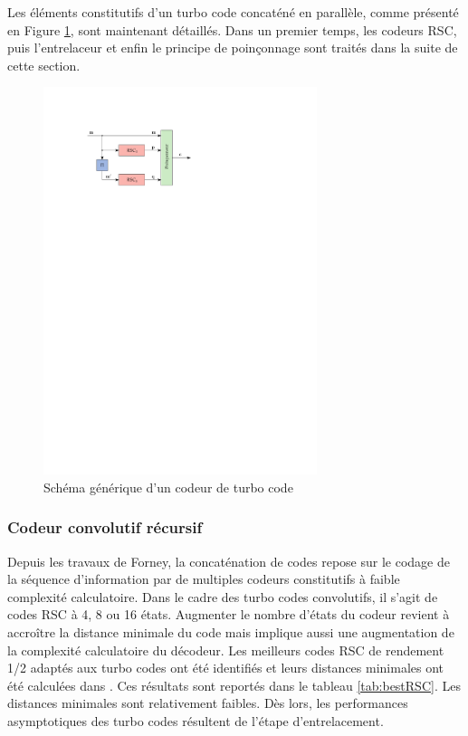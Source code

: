 Les éléments constitutifs d'un turbo code concaténé en parallèle, comme présenté en Figure \ref{fig:turboEnc}, sont 
maintenant détaillés. Dans un premier temps, les codeurs RSC, puis l'entrelaceur et enfin le principe de poinçonnage sont 
traités dans la suite de cette section.

\begin{figure}[!h]
	\centering
	\includegraphics[width=8cm]{main/ch1_fig/turboEnc.pdf}
	\caption{\label{fig:turboEnc} Schéma générique d'un codeur de turbo code}
\end{figure}


\subsubsection{Codeur convolutif récursif}
Depuis les travaux de Forney, la concaténation de codes repose sur le codage de la séquence d'information par de multiples codeurs 
constitutifs à faible complexité calculatoire. Dans le cadre des turbo codes convolutifs, il s'agit de codes RSC à 4, 8 ou 16 états.
Augmenter le nombre d'états du codeur revient à accroître la distance minimale du code mais implique aussi une augmentation 
de la complexité calculatoire du décodeur. Les meilleurs codes RSC de rendement 1/2 adaptés aux turbo codes ont été identifiés 
et leurs distances minimales ont été calculées dans \cite{RSCdist}. Ces résultats sont reportés dans le tableau \ref{tab:bestRSC}. 
Les distances minimales sont relativement faibles. Dès lors, les performances asymptotiques des turbo codes résultent de l'étape 
d'entrelacement. 

